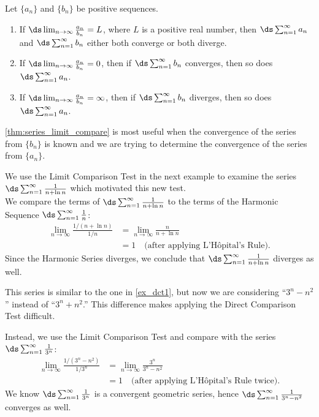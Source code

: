 {Let $\{a_n\}$ and $\{b_n\}$ be positive sequences.
	\begin{enumerate}
		\item If $\ds\lim_{n\to\infty} \frac{a_n}{b_n} = L$, where $L$ is a positive real number, then $\ds \sum_{n=1}^\infty a_n$ and $\ds \sum_{n=1}^\infty b_n$ either both converge or both diverge.
		\item	If $\ds\lim_{n\to\infty} \frac{a_n}{b_n} = 0$, then if $\ds \sum_{n=1}^\infty b_n$ converges, then so does $\ds \sum_{n=1}^\infty a_n$.
		\item	If $\ds\lim_{n\to\infty} \frac{a_n}{b_n} = \infty$, then if $\ds \sum_{n=1}^\infty b_n$ diverges, then so does $\ds \sum_{n=1}^\infty a_n$.
	\end{enumerate}}


\autoref{thm:series_limit_compare} is most useful when the convergence of the series from $\{b_n\}$ is known and we are trying to determine the convergence of the series from $\{a_n\}$. 

We use the Limit Comparison Test in the next example to examine the series $\ds\sum_{n=1}^\infty \frac1{n+\ln n}$ which motivated this new test.\\

{We compare the terms of $\ds\sum_{n=1}^\infty \frac1{n+\ln n}$ to the terms of the Harmonic Sequence $\ds\sum_{n=1}^\infty \frac1{n}$:
\begin{align*}
\lim_{n\to\infty}\frac{1/(n+\ln n)}{1/n} &= \lim_{n\to\infty} \frac{n}{n+\ln n} \\
			&= 1\quad \text{(after applying L'H\^opital's Rule)}.
\end{align*}
Since the Harmonic Series diverges, we conclude that $\ds\sum_{n=1}^\infty \frac1{n+\ln n}$ diverges as well.}

{This series is similar to the one in \autoref{ex_dct1}, but now we are considering ``$3^n-n^2$'' instead of ``$3^n+n^2$.'' This difference makes applying the Direct Comparison Test difficult.

Instead, we use the Limit Comparison Test and compare with the series $\ds\sum_{n=1}^\infty \frac1{3^n}$:
\begin{align*}
\lim_{n\to\infty}\frac{1/(3^n-n^2)}{1/3^n} &= \lim_{n\to\infty}\frac{3^n}{3^n-n^2} \\
		&= 1 \quad \text{(after applying L'H\^opital's Rule twice)}.
\end{align*}
We know $\ds\sum_{n=1}^\infty \frac1{3^n}$ is a convergent geometric series, hence $\ds\sum_{n=1}^\infty \frac1{3^n-n^2}$ converges as well.}

